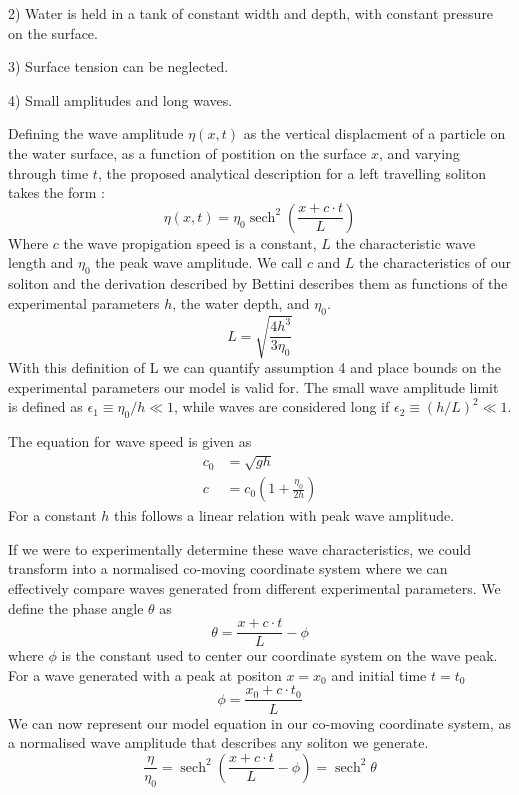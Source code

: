 \documentclass[10pt, twocolumn]{revtex4}    %
\DeclareMathOperator{\sech}{sech}
\begin{document}
2) Water is held in a tank of constant width and depth, with constant pressure on the surface.

3) Surface tension can be neglected.

4) Small amplitudes and long waves.


Defining the wave amplitude $\eta(x, t)$ as the vertical displacment of a particle on the water surface, as a function of postition on the surface $x$, and varying through time $t$, the proposed analytical description for a left travelling soliton takes the form \cite{bettini}:
\begin{equation}
  \eta(x, t) = \eta_0\sech^2(\frac{x + c \cdot t}{L})
\label{eq:model}
\end{equation}
Where $c$ the wave propigation speed is a constant, $L$ the characteristic wave length and $\eta_0$ the peak wave amplitude.
We call $c$ and $L$ the characteristics of our soliton and the derivation described by Bettini describes them as functions of the experimental parameters $h$, the water depth, and $\eta_0$.
\begin{equation}
  L = \sqrt{\frac{4h^3}{3\eta_0}}
  \label{eq:L}
\end{equation}
With this definition of L we can quantify assumption 4 and place bounds on the experimental parameters our model is valid for.
The small wave amplitude limit is defined as $\epsilon_1 \equiv \eta_0/h \ll 1$, while waves are considered long if $\epsilon_2 \equiv (h/L)^2 \ll 1$.

The equation for wave speed is given as
\begin{equation}
\begin{align*}
  c_0 &= \sqrt{gh} \\
  c   &= c_0(1 + \frac{\eta_0}{2h})
  \label{eq:c}
\end{align*}
\end{equation}
For a constant $h$ this follows a linear relation with peak wave amplitude.

If we were to experimentally determine these wave characteristics, we could transform into a normalised co-moving coordinate system where we can effectively compare waves generated from different experimental parameters.
We define the phase angle $\theta$ as
\begin{equation}
  \theta = \frac{x + c \cdot t}{L} - \phi
  \label{eq:coords}
\end{equation}
where $\phi$ is the constant used to center our coordinate system on the wave peak.
For a wave generated with a peak at positon $x = x_0$ and initial time $t = t_0$
\begin{equation}
  \phi = \frac{x_0 + c \cdot t_0}{L}
\end{equation}
We can now represent our model equation in our co-moving coordinate system, as a normalised wave amplitude that describes any soliton we generate.
\begin{equation}
  \frac{\eta}{\eta_0} = \sech^2(\frac{x + c \cdot t}{L} - \phi) = \sech^2{\theta}
  \label{eq:norm}
\end{equation}
\end{document}
